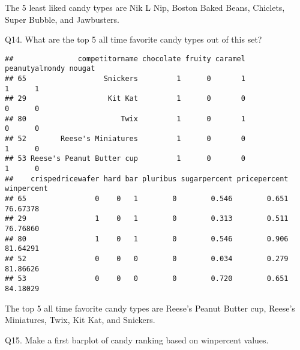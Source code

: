 \documentclass[
]{article}
\newenvironment{Shaded}{\begin{snugshade}}{\end{snugshade}}
\newcommand{\AttributeTok}[1]{\textcolor[rgb]{0.13,0.29,0.53}{#1}}
\newcommand{\CommentTok}[1]{\textcolor[rgb]{0.56,0.35,0.01}{\textit{#1}}}
\newcommand{\DecValTok}[1]{\textcolor[rgb]{0.00,0.00,0.81}{#1}}
\newcommand{\FunctionTok}[1]{\textcolor[rgb]{0.13,0.29,0.53}{\textbf{#1}}}
\newcommand{\NormalTok}[1]{#1}
\newcommand{\SpecialCharTok}[1]{\textcolor[rgb]{0.81,0.36,0.00}{\textbf{#1}}}
\begin{document}
The 5 least liked candy types are Nik L Nip, Boston Baked Beans,
Chiclets, Super Bubble, and Jawbusters.

Q14. What are the top 5 all time favorite candy types out of this set?

\begin{Shaded}
\end{Shaded}

\begin{verbatim}
##               competitorname chocolate fruity caramel peanutyalmondy nougat
## 65                  Snickers         1      0       1              1      1
## 29                   Kit Kat         1      0       0              0      0
## 80                      Twix         1      0       1              0      0
## 52        Reese's Miniatures         1      0       0              1      0
## 53 Reese's Peanut Butter cup         1      0       0              1      0
##    crispedricewafer hard bar pluribus sugarpercent pricepercent winpercent
## 65                0    0   1        0        0.546        0.651   76.67378
## 29                1    0   1        0        0.313        0.511   76.76860
## 80                1    0   1        0        0.546        0.906   81.64291
## 52                0    0   0        0        0.034        0.279   81.86626
## 53                0    0   0        0        0.720        0.651   84.18029
\end{verbatim}

The top 5 all time favorite candy types are Reese's Peanut Butter cup,
Reese's Miniatures, Twix, Kit Kat, and Snickers.

Q15. Make a first barplot of candy ranking based on winpercent values.
\end{document}
